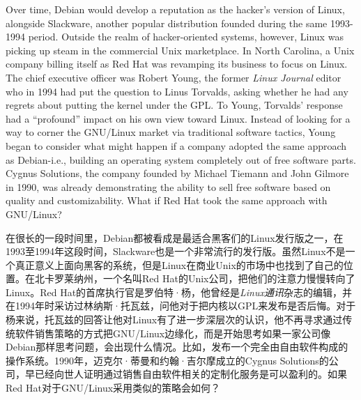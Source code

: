 \ifdefined\eng
Over time, Debian would develop a reputation as the hacker's version of Linux, alongside Slackware, another popular distribution founded during the same 1993-1994 period. Outside the realm of hacker-oriented systems, however, Linux was picking up steam in the commercial Unix marketplace. In North Carolina, a Unix company billing itself as Red Hat was revamping its business to focus on Linux. The chief executive officer was Robert Young, the former \textit{Linux Journal} editor who in 1994 had put the question to Linus Torvalds, asking whether he had any regrets about putting the kernel under the GPL. To Young, Torvalds' response had a ``profound'' impact on his own view toward Linux. Instead of looking for a way to corner the GNU/Linux market via traditional software tactics, Young began to consider what might happen if a company adopted the same approach as Debian-i.e., building an operating system completely out of free software parts. Cygnus Solutions, the company founded by Michael Tiemann and John Gilmore in 1990, was already demonstrating the ability to sell free software based on quality and customizability. What if Red Hat took the same approach with GNU/Linux?

\fi

\ifdefined\chs
在很长的一段时间里，Debian都被看成是最适合黑客们的Linux发行版之一，在1993至1994年这段时间，Slackware也是一个非常流行的发行版。虽然Linux不是一个真正意义上面向黑客的系统，但是Linux在商业Unix的市场中也找到了自己的位置。在北卡罗莱纳州，一个名叫Red Hat的Unix公司，把他们的注意力慢慢转向了Linux。Red Hat的首席执行官是罗伯特·杨，他曾经是\textit{Linux通讯}杂志的编辑，并在1994年时采访过林纳斯·托瓦兹，问他对于把内核以GPL来发布是否后悔。对于杨来说，托瓦兹的回答让他对Linux有了进一步深层次的认识，他不再寻求通过传统软件销售策略的方式把GNU/Linux边缘化，而是开始思考如果一家公司像Debian那样思考问题，会出现什么情况。比如，发布一个完全由自由软件构成的操作系统。1990年，迈克尔·蒂曼和约翰·吉尔摩成立的Cygnus Solutions的公司，早已经向世人证明通过销售自由软件相关的定制化服务是可以盈利的。如果Red Hat对于GNU/Linux采用类似的策略会如何？
\fi

